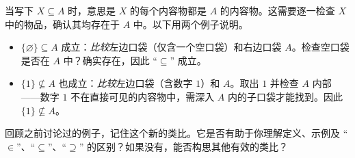 当写下 $X \subseteq A$ 时，意思是 $X$ 的每个内容物都是 $A$ 的内容物。这需要逐一检查 $X$ 中的物品，确认其均存在于 $A$ 中。以下用两个例子说明。

\begin{itemize}
    \item $\{\varnothing\} \subseteq A$ 成立：\emph{比较}左边口袋（仅含一个空口袋）和右边口袋 $A$。检查空口袋是否在 $A$ 中？确实存在，因此 ``$\subseteq$'' 成立。
    \item $\{1\} \nsubseteq A$ 也成立：\emph{比较}左边口袋（含数字 $1$）和 $A$。取出 $1$ 并检查 $A$ 内部——数字 $1$ 不在直接可见的内容物中，需深入 $A$ 内的子口袋才能找到。因此 $\{1\} \nsubseteq A$。
\end{itemize}

回顾之前讨论过的例子，记住这个新的类比。它是否有助于你理解定义、示例及 ``$\in$''、``$\subseteq$''、``$\supseteq$'' 的区别？如果没有，能否构思其他有效的类比？

\clearpage